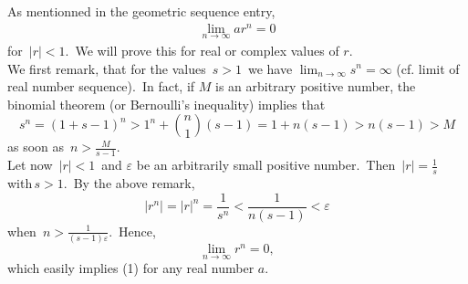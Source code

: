 \documentclass[12pt]{article}
\theoremstyle{definition}
\begin{document}
As mentionned in the geometric sequence entry, 
\begin{align}
\lim_{n\to\infty}ar^n = 0
\end{align}
for\, $|r| < 1$.\, We will prove this for real or complex values of $r$.\\

We first remark, that for the values\, $s > 1$\, we have\; 
$\displaystyle\lim_{n\to\infty}s^n = \infty$ (cf. limit of real number sequence).\, In fact, if $M$ is an arbitrary positive number, the binomial theorem (or Bernoulli's inequality) implies that
$$s^n = (1+s-1)^n > 1^n+\binom{n}{1}(s-1) = 1+n(s-1) > n(s-1) > M$$
as soon as\, $\displaystyle n > \frac{M}{s-1}$.\\

Let now\, $|r| < 1$\, and $\varepsilon$ be an arbitrarily small positive number.\, Then\, $\displaystyle|r| = \frac{1}{s}$\, with\,$s > 1$.\, By the above remark,
$$|r^n| = |r|^n = \frac{1}{s^n} < \frac{1}{n(s-1)} < \varepsilon$$
when\, $\displaystyle n > \frac{1}{(s-1)\varepsilon}$.\, Hence, 
$$\lim_{n\to\infty}r^n =0,$$
which easily implies (1) for any real number $a$.
\end{document}
